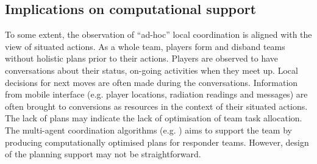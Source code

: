 
\subsection{Implications on computational support}

To some extent, the observation of ``ad-hoc'' local coordination is aligned with the view of situated actions. As a whole team, players form and disband teams without holistic plans prior to their actions. Players are observed to have conversations about their status, on-going activities when they meet up. Local decisions for next moves are often made during the conversations.  Information from mobile interface (e.g. player locations, radiation readings and messages) are often brought to conversions as resources in the context of their situated actions. \\

The lack of plans may indicate the lack of optimisation of team task allocation. The multi-agent coordination algorithms (e.g. \citep{Ramchurn2010}) aims to support the team by producing computationally optimised plans for responder teams. However, design of the planning support may not be straightforward. \\

